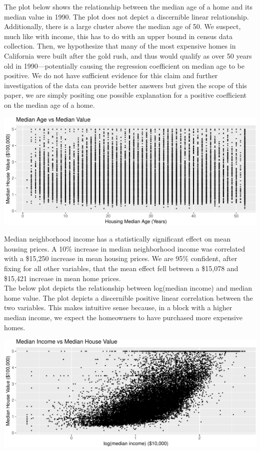 \documentclass{article}
\begin{document}
The plot below shows the relationship between the median age of a home and its median value in 1990. The plot does not depict a discernible linear relationship. Additionally, there is a large cluster above the median age of 50. We suspect, much like with income, this has to do with an upper bound in census data collection. Then, we hypothesize that many of the most expensive homes in California were built after the gold rush, and thus would qualify as over 50 years old in 1990—potentially causing the regression coefficient on median age to be positive. We do not have sufficient evidence for this claim and further investigation of the data can provide better answers but given the scope of this paper, we are simply positing one possible explanation for a positive coefficient on the median age of a home. 

\hfill

\begin{center}
    \includegraphics[scale = 0.75]{Median Age vs Median Value.pdf}
\end{center}

Median neighborhood income has a statistically significant effect on mean housing prices. A 10\% increase in median neighborhood income was correlated with a \$15,250 increase in mean housing prices. We are 95\% confident, after fixing for all other variables, that the mean effect fell between a \$15,078 and \$15,421 increase in mean home prices. \\

The below plot depicts the relationship between log(median income) and median home value. The plot depicts a discernible positive linear correlation between the two variables. This makes intuitive sense because, in a block with a higher median income, we expect the homeowners to have purchased more expensive homes.

\hfill

\begin{center}
    \includegraphics[scale = 0.75]{Median Income vs Median House Value.pdf}
\end{center}
\end{document}
